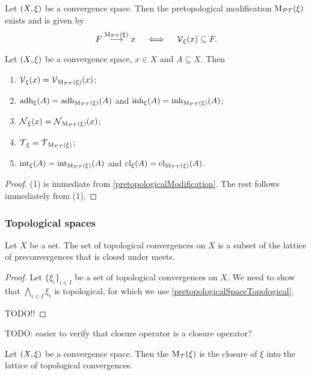 \begin{proposition} \label{pretopologicalModification}
Let $\sSet{X,\xi}$ be a convergence space. Then the pretopological modification $\operatorname{M_\mathcal{PT}}(\xi)$ exists and is given by
\[ F \overset{\operatorname{M_\mathcal{PT}}(\xi)}{\longrightarrow} x \quad\iff\quad \operatorname{\mathcal{V}}_\xi(x) \subseteq F. \]
\end{proposition}

\begin{lemma}
Let $\sSet{X,\xi}$ be a convergence space, $x\in X$ and $A\subseteq X$. Then
\begin{enumerate}
\item $\operatorname{\mathcal{V}}_{\xi}(x) = \operatorname{\mathcal{V}}_{\operatorname{M_\mathcal{PT}}(\xi)}(x)$;
\item $\operatorname{adh}_\xi(A) = \operatorname{adh}_{\operatorname{M_\mathcal{PT}}(\xi)}(A)$ and $\operatorname{inh}_\xi(A) = \operatorname{inh}_{\operatorname{M_\mathcal{PT}}(\xi)}(A)$;
\item $\operatorname{\mathcal{N}}_{\xi}(x) = \operatorname{\mathcal{N}}_{\operatorname{M_\mathcal{PT}}(\xi)}(x)$;
\item $\operatorname{\mathcal{T}}_{\xi} = \operatorname{\mathcal{T}}_{\operatorname{M_\mathcal{PT}}(\xi)}$;
\item $\operatorname{int}_\xi(A) = \operatorname{int}_{\operatorname{M_\mathcal{PT}}(\xi)}(A)$ and $\operatorname{cl}_\xi(A) = \operatorname{cl}_{\operatorname{M_\mathcal{PT}}(\xi)}(A)$.
\end{enumerate}
\end{lemma}
\begin{proof}
(1) is immediate from \ref{pretopologicalModification}. The rest follows immediately from (1).
\end{proof}


\subsubsection{Topological spaces}
\begin{lemma}
Let $X$ be a set. The set of topological convergences on $X$ is a subset of the lattice of preconvergences that is closed under meets.
\end{lemma}
\begin{proof}
Let $\{\xi_i\}_{i\in I}$ be a set of topological convergences on $X$. We need to show that $\bigwedge_{i\in I}\xi_i$ is topological, for which we use \ref{pretopologicalSpaceTopological}.

TODO!!
\end{proof}
TODO: easier to verify that closure operator is a closure operator?

\begin{definition}
Let $\sSet{X,\xi}$ be a convergence space. Then the  $\operatorname{M_\mathcal{T}}(\xi)$ is the closure of $\xi$ into the lattice of topological convergences.
\end{definition}

